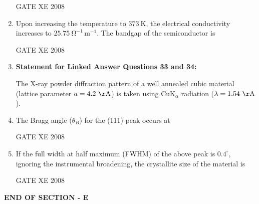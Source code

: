 \documentclass[12pt]{article}
\begin{document}
\begin{enumerate}
    GATE XE 2008

    \item Upon increasing the temperature to $373 \ \mathrm{K}$, the electrical conductivity increases to $25.75 \ \mathrm{\Omega^{-1} \, m^{-1}}$. The bandgap of the semiconductor is

\begin{enumerate}
\end{enumerate}
    
    GATE XE 2008

    \item[] \textbf{Statement for Linked Answer Questions 33 and 34:} 

    The X-ray powder diffraction pattern of a well annealed cubic material (lattice parameter $a = 4.2 \ \mathrm{\AA}$) is taken using CuK$_\alpha$ radiation ($\lambda = 1.54 \ \mathrm{\AA}$).

    \item The Bragg angle ($\theta_B$) for the (111) peak occurs at

\begin{enumerate}
\end{enumerate}
   
    GATE XE 2008

    \item If the full width at half maximum (FWHM) of the above peak is $0.4^{\circ}$, ignoring the instrumental broadening, the crystallite size of the material is

\begin{enumerate}
\end{enumerate}
    
    GATE XE 2008

\end{enumerate}    
\begin{center}
    \textbf{END OF SECTION - E}
\end{center}
\end{document}
